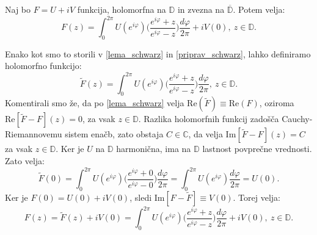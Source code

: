 \documentclass[mat1]{fmfdelo}
\begin{document}
    \begin{trditev}
        \label{schwarz_int_f}
        Naj bo $F = U + iV$ funkcija, holomorfna na $\mathbb{D}$ in zvezna na $\overline{\mathbb{D}}$. Potem velja: 
        $$ 
            F(z) = \int_{0}^{2 \pi}{U(e^{i \varphi})\bigg(\frac{e^{i\varphi}+z}{e^{i\varphi}-z}\bigg)\frac{d \varphi}{2 \pi}} + i V(0),~z \in \mathbb{D}.
        $$
    \end{trditev}
    \begin{dokaz}
        Enako kot smo to storili v \eqref{lema_schwarz} in \eqref{priprav_schwarz}, lahko definiramo holomorfno funkcijo:
        $$
        \widetilde{F}(z) = \int_{0}^{2 \pi}{U(e^{i \varphi})\bigg(\frac{e^{i\varphi}+z}{e^{i\varphi}-z}\bigg)\frac{d \varphi}{2 \pi}},~z \in \mathbb{D}.
        $$
        Komentirali smo že, da po \eqref{lema_schwarz} velja $\text{Re}(\widetilde{F}) \equiv \text{Re}(F)$, oziroma $\text{Re}[\widetilde{F} - F](z) = 0$, za vsak $z \in \mathbb{D}$. Razlika holomorfnih funkcij zadošča Cauchy-Riemannovemu sistem enačb, zato obstaja $C \in \mathbb{C}$, da velja $\text{Im}[\widetilde{F} - F](z) = C$ za vsak $z \in \mathbb{D}$.
        Ker je $U$ na $\mathbb{D}$ harmonična, ima na $\mathbb{D}$ lastnost povprečne vrednosti. Zato velja:
        $$
        \widetilde{F}(0) = \int_{0}^{2 \pi}{U(e^{i \varphi})\bigg(\frac{e^{i\varphi}+0}{e^{i\varphi}-0}\bigg)\frac{d \varphi}{2 \pi}} = \int_{0}^{2 \pi}{U(e^{i \varphi})\frac{d \varphi}{2 \pi}} = U(0).
        $$
        Ker je $F(0) = U(0) + iV(0)$, sledi $\text{Im}[F - \widetilde{F}] \equiv V(0)$.
        Torej velja:
        $$ 
        F(z) = \widetilde{F}(z) + iV(0) = \int_{0}^{2 \pi}{U(e^{i \varphi})\bigg(\frac{e^{i\varphi}+z}{e^{i\varphi}-z}\bigg)\frac{d \varphi}{2 \pi}} + i V(0),~z \in \mathbb{D}.
        $$
    \end{dokaz}
\end{document}
